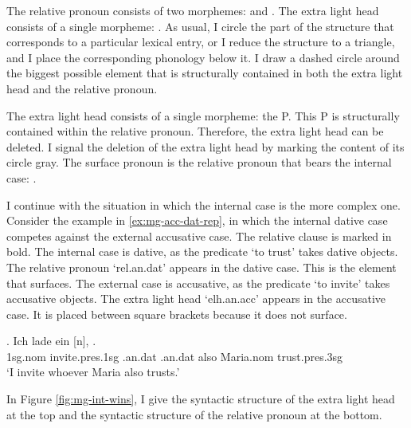 The relative pronoun consists of two morphemes:  and .
The extra light head consists of a single morpheme: .
As usual, I circle the part of the structure that corresponds to a particular lexical entry, or I reduce the structure to a triangle, and I place the corresponding phonology below it.
I draw a dashed circle around the biggest possible element that is structurally contained in both the extra light head and the relative pronoun.

The extra light head consists of a single morpheme: the P.
This P is structurally contained within the relative pronoun. Therefore, the extra light head can be deleted. I signal the deletion of the extra light head by marking the content of its circle gray.
The surface pronoun is the relative pronoun that bears the internal case: .

I continue with the situation in which the internal case is the more complex one.
Consider the example in \ref{ex:mg-acc-dat-rep}, in which the internal dative case competes against the external accusative case. The relative clause is marked in bold.
The internal case is dative, as the predicate  `to trust' takes dative objects. The relative pronoun  `\ac{rel}.\ac{an}.\ac{dat}' appears in the dative case. This is the element that surfaces.
The external case is accusative, as the predicate  `to invite' takes accusative objects. The extra light head  `\ac{elh}.\ac{an}.\ac{acc}' appears in the accusative case. It is placed between square brackets because it does not surface.

\exg. Ich {lade ein} [n],    .\\
1\ac{sg}.\ac{nom} invite.\ac{pres}.1\ac{sg}\scsub{[acc]} .\ac{an}.\ac{dat} .\ac{an}.\ac{dat} also Maria.\ac{nom} trust.\ac{pres}.3\ac{sg}\scsub{[dat]}\\
`I invite whoever Maria also trusts.' \label{ex:mg-acc-dat-rep}

In Figure \ref{fig:mg-int-wins}, I give the syntactic structure of the extra light head at the top and the syntactic structure of the relative pronoun at the bottom.

